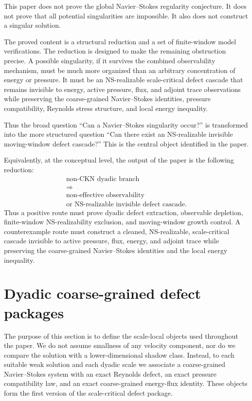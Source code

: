 \documentclass[11pt]{article}
\numberwithin{equation}{section}
\theoremstyle{plain}
\theoremstyle{definition}
\theoremstyle{remark}
\begin{document}
This paper does not prove the global Navier--Stokes regularity conjecture.  It does not prove that all potential singularities are impossible.  It also does not construct a singular solution.

The proved content is a structural reduction and a set of finite-window model verifications.  The reduction is designed to make the remaining obstruction precise.  A possible singularity, if it survives the combined observability mechanism, must be much more organized than an arbitrary concentration of energy or pressure.  It must be an NS-realizable scale-critical defect cascade that remains invisible to energy, active pressure, flux, and adjoint trace observations while preserving the coarse-grained Navier--Stokes identities, pressure compatibility, Reynolds stress structure, and local energy inequality.

Thus the broad question ``Can a Navier--Stokes singularity occur?'' is transformed into the more structured question ``Can there exist an NS-realizable invisible moving-window defect cascade?''  This is the central object identified in the paper.

Equivalently, at the conceptual level, the output of the paper is the following reduction:
\[
\boxed{
\begin{gathered}
\text{non-CKN dyadic branch}\\
\Longrightarrow\\
\text{non-effective observability}\\
\text{or NS-realizable invisible defect cascade.}
\end{gathered}}
\]
Thus a positive route must prove dyadic defect extraction, observable depletion, finite-window NS-realizability exclusion, and moving-window growth control.  A counterexample route must construct a cleaned, NS-realizable, scale-critical cascade invisible to active pressure, flux, energy, and adjoint trace while preserving the coarse-grained Navier--Stokes identities and the local energy inequality.



\section{Dyadic coarse-grained defect packages}
\label{sec:dyadic-defect-packages}

The purpose of this section is to define the scale-local objects used throughout the paper.  We do not assume smallness of any velocity component, nor do we compare the solution with a lower-dimensional shadow class.  Instead, to each suitable weak solution and each dyadic scale we associate a coarse-grained Navier--Stokes system with an exact Reynolds defect, an exact pressure compatibility law, and an exact coarse-grained energy-flux identity.  These objects form the first version of the scale-critical defect package.
\end{document}

